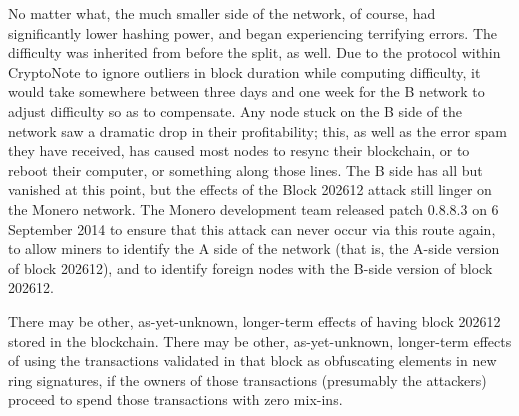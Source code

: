 \documentclass{mrl}
\begin{document}
No matter what, the much smaller side of the network, of course, had significantly lower hashing power, and began experiencing terrifying errors. The difficulty was inherited from before the split, as well. Due to the protocol within CryptoNote to ignore outliers in block duration while computing difficulty, it would take somewhere between three days and one week for the B network to adjust difficulty so as to compensate. Any node stuck on the B side of the network saw a dramatic drop in their profitability; this, as well as the error spam they have received, has caused most nodes to resync their blockchain, or to reboot their computer, or something along those lines. The B side has all but vanished at this point, but the effects of the Block 202612 attack still linger on the Monero network. The Monero development team released patch 0.8.8.3 on 6 September 2014 to ensure that this attack can never occur via this route again, to allow miners to identify the A side of the network (that is, the A-side version of block 202612), and to identify foreign nodes with the B-side version of block 202612.

There may be other, as-yet-unknown, longer-term effects of having block 202612 stored in the blockchain. There may be other, as-yet-unknown, longer-term effects of using the transactions validated in that block as obfuscating elements in new ring signatures, if the owners of those transactions (presumably the attackers) proceed to spend those transactions with zero mix-ins.

\begin{backmatter}


\end{backmatter}
\end{document}
